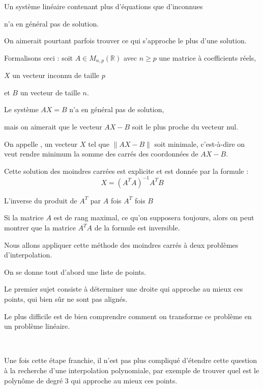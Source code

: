 \change
Un système linéaire contenant plus d'équations que d'inconnues 

\change
n'a en général pas de solution.

\change
On aimerait pourtant parfois trouver 
ce qui s'approche le plus d'une solution.

\change
Formalisons ceci : 
soit $A \in M_{n,p}(\mathbb R)$ avec $n \ge p$ une matrice à coefficients réels, 

\change
$X$ un vecteur inconnu de taille $p$ 

\change
et $B$ un vecteur de taille $n$.

\change
Le système $AX=B$ n'a en général pas de solution, 

mais on aimerait que le vecteur 
$AX-B$ soit le plus proche du vecteur nul.

\change
On appelle , un vecteur $X$ 
tel que $\| AX -B \|$ soit minimale, c'est-à-dire 
on veut rendre minimum la somme des carrés des coordonnées de $AX-B$.

\change
Cette solution des moindres carrées est explicite et est donnée par la formule :
\begin{equation}
X = (A^TA)^{-1} A^T B
\end{equation}
\begin{center}
L'inverse du produit de $A^T$ par $A$ \quad fois $A^T$ \quad fois $B$
\end{center}

Si la matrice $A$ est de rang maximal, ce qu'on supposera toujours, 
alors on peut montrer que la matrice $A^TA$ de la formule est inversible.


\diapo


Nous allons appliquer cette méthode des moindres carrés à deux problèmes d'interpolation.

On se donne tout d'abord une liste de points.

Le premier sujet consiste à déterminer une droite qui approche au mieux ces points, 
qui bien sûr ne sont pas alignés.

Le plus difficile est de bien comprendre comment on transforme ce problème en un problème linéaire.

~

Une fois cette étape franchie, il n'est pas plus compliqué
 d'étendre cette question à la recherche d'une interpolation polynomiale, par exemple de trouver 
quel est le polynôme de degré $3$ qui approche 
au mieux ces points.
  


